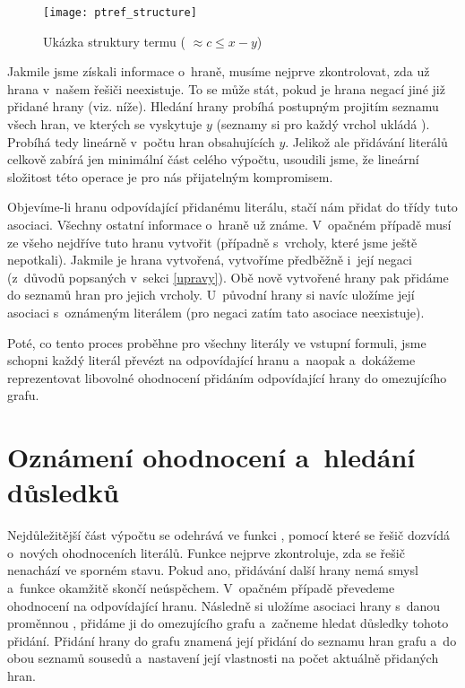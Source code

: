 \begin{figure}
	\centering
	\texttt{[image: ptref\_structure]}
	\caption{Ukázka struktury termu ( $\approx c \leq x - y$)}
	\label{fig:term}
\end{figure}

Jakmile jsme získali informace o~hraně, musíme nejprve zkontrolovat, zda už hrana v~našem řešiči neexistuje. To se může stát, pokud je hrana negací jiné již přidané hrany (viz. níže). %
Hledání hrany probíhá postupným projitím seznamu všech hran, ve kterých se vyskytuje $y$ (seznamy si pro každý vrchol ukládá ). Probíhá tedy lineárně v~počtu hran obsahujících $y$. Jelikož ale přidávání literálů celkově zabírá jen minimální část celého výpočtu, usoudili jsme, že lineární složitost této operace je pro nás přijatelným kompromisem.

Objevíme-li hranu odpovídající přidanému literálu, stačí nám přidat do třídy  tuto asociaci. Všechny ostatní informace o~hraně už známe. V~opačném případě musí ze všeho nejdříve  tuto hranu vytvořit (případně s~vrcholy, které jsme ještě nepotkali). Jakmile je hrana vytvořená, vytvoříme předběžně i~její negaci (z~důvodů popsaných v~sekci \ref{upravy}). Obě nově vytvořené hrany pak přidáme do seznamů hran pro jejich vrcholy. U~původní hrany si navíc uložíme její asociaci s~oznámeným literálem (pro negaci zatím tato asociace neexistuje). 

Poté, co tento proces proběhne pro všechny literály ve vstupní formuli, jsme schopni každý literál převézt na odpovídající hranu a~naopak a~dokážeme reprezentovat libovolné ohodnocení přidáním odpovídající hrany do omezujícího grafu.

\section{Oznámení ohodnocení a~hledání důsledků}\label{dusl}

Nejdůležitější část výpočtu se odehrává ve funkci , pomocí které se řešič dozvídá o~nových ohodnoceních literálů. Funkce nejprve zkontroluje, zda se řešič nenachází ve sporném stavu. Pokud ano, přidávání další hrany nemá smysl a~funkce okamžitě skončí neúspěchem. V~opačném případě převedeme ohodnocení na odpovídající hranu. Následně si uložíme asociaci hrany s~danou proměnnou , přidáme ji do omezujícího grafu a~začneme hledat důsledky tohoto přidání. Přidání hrany do grafu znamená její přidání do seznamu hran grafu a~do obou seznamů sousedů a~nastavení její vlastnosti  na počet aktuálně přidaných hran.

